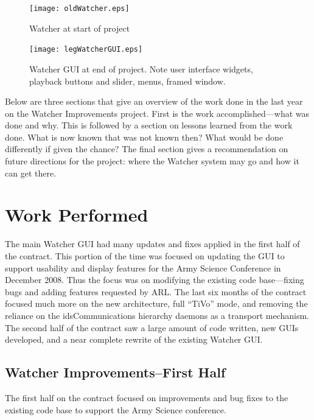 \documentclass{report}
\begin{document}
\begin{figure}[htb]
\centering
\texttt{[image: oldWatcher.eps]}
\caption{Watcher at start of project}
\label{fig:oldWatcher}
\end{figure}

\begin{figure}[htb]
\centering
\texttt{[image: legWatcherGUI.eps]}
\caption{Watcher GUI at end of project. Note user interface widgets, playback buttons and slider, menus, framed window.}
\label{fig:legWatcherGUI}
\end{figure}

Below are three sections that give an overview of the work done in the last year on the Watcher Improvements project. First
is the work accomplished---what was done and why. This is followed by a section on lessons learned from the work done. What is now known 
that was not known then? What would be done differently if given the chance? The final section gives a recommendation on future directions
for the project: where the Watcher system may go and how it can get there. 

\section{Work Performed}

The main Watcher GUI had many updates and fixes applied in the first half of the contract. This portion of the time was focused on updating the GUI to 
support usability and display features for the Army Science Conference in December 2008. Thus the focus was on modifying the existing code base---fixing bugs 
and adding features requested by ARL. The last six months of the contract focused much more on the new architecture, full ``TiVo'' mode, and removing 
the reliance on the idsCommunications hierarchy daemons as a transport mechanism. The second half of the contract saw a large amount of code written, new GUIs developed, and 
a near complete rewrite of the existing Watcher GUI. 

\subsection{Watcher Improvements--First Half}
The first half on the contract focused on improvements and bug fixes to the existing code base to support the Army Science conference.  
\end{document}

